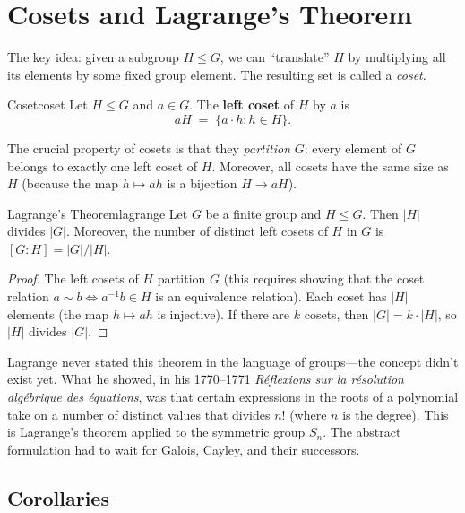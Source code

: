 \documentclass[11pt, a4paper, oneside]{book}
\begin{document}
\section{Cosets and Lagrange's Theorem}

The key idea: given a subgroup $H \leq G$, we can ``translate'' $H$ by
multiplying all its elements by some fixed group element. The resulting set
is called a \emph{coset}.

\begin{defn}{Coset}{coset}
Let $H \leq G$ and $a \in G$. The \textbf{left coset} of $H$ by $a$ is
\[
  aH \;=\; \{a \cdot h : h \in H\}.
\]
\end{defn}

The crucial property of cosets is that they \emph{partition} $G$: every element
of $G$ belongs to exactly one left coset of $H$. Moreover, all cosets have the
same size as $H$ (because the map $h \mapsto ah$ is a bijection $H \to aH$).

\begin{thm}{Lagrange's Theorem}{lagrange}
Let $G$ be a finite group and $H \leq G$. Then $|H|$ divides $|G|$.
Moreover, the number of distinct left cosets of $H$ in $G$ is
$[G : H] = |G| / |H|$.
\end{thm}

\begin{proof}
The left cosets of $H$ partition $G$ (this requires showing that the coset
relation $a \sim b \iff a^{-1}b \in H$ is an equivalence relation). Each coset
has $|H|$ elements (the map $h \mapsto ah$ is injective). If there are $k$
cosets, then $|G| = k \cdot |H|$, so $|H|$ divides $|G|$.
\end{proof}

\begin{historical}[title={Lagrange and the ``Theorem''}]
Lagrange never stated this theorem in the language of groups---the concept
didn't exist yet. What he showed, in his 1770--1771 \textit{Réflexions sur
la résolution algébrique des équations}, was that certain expressions in the
roots of a polynomial take on a number of distinct values that divides $n!$
(where $n$ is the degree). This is Lagrange's theorem applied to the symmetric
group $S_n$. The abstract formulation had to wait for Galois, Cayley, and
their successors.
\end{historical}

\subsection{Corollaries}
\end{document}
